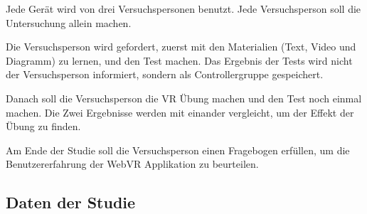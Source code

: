 Jede Gerät wird von drei Versuchspersonen benutzt. Jede Versuchsperson soll die Untersuchung allein machen.

Die Versuchsperson wird gefordert, zuerst mit den Materialien (Text, Video und Diagramm) zu lernen, und den Test machen. Das Ergebnis der Tests wird nicht der Versuchsperson informiert, sondern als Controllergruppe gespeichert.

Danach soll die Versuchsperson die VR Übung machen und den Test noch einmal machen. Die Zwei Ergebnisse werden mit einander vergleicht, um der Effekt der Übung zu finden.

Am Ende der Studie soll die Versuchsperson einen Fragebogen erfüllen, um die Benutzererfahrung der WebVR Applikation zu beurteilen.

\subsection{Daten der Studie}










